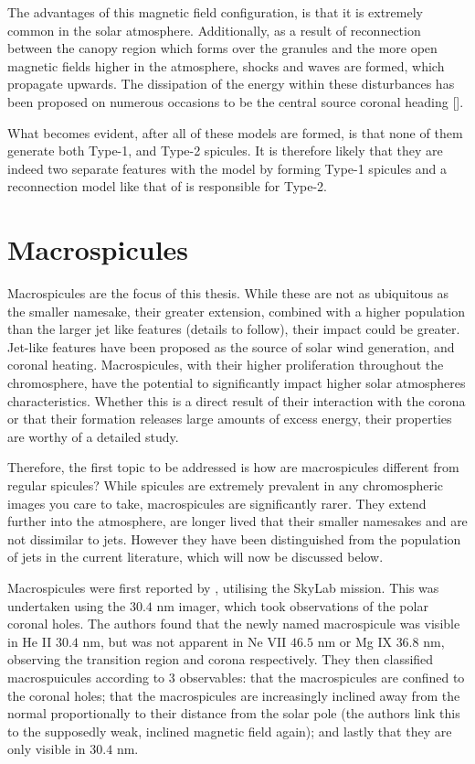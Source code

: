 The advantages of this magnetic field configuration, is that it is extremely common in the solar atmosphere.
Additionally, as a result of reconnection between the canopy region which forms over the granules and the more open magnetic fields higher in the atmosphere, shocks and waves are formed, which propagate upwards.
The dissipation of the energy within these disturbances has been proposed on numerous occasions to be the central source coronal heading [\cite{Klimchuk2012, Kudoh1999, Athay2000}]. 

What becomes evident, after all of these models are formed, is that none of them generate both Type-1, and Type-2 spicules.
It is therefore likely that they are indeed two separate features with the model by \cite{DePointeu2004} forming Type-1 spicules and a reconnection model like that of \cite{Moore2011spic_recon} is responsible for Type-2.


\section{Macrospicules}
\label{sec:MS}

Macrospicules are the focus of this thesis.
While these are not as ubiquitous as the smaller namesake, their greater extension, combined with a higher population than the larger jet like features (details to follow), their impact could be greater.
Jet-like features have been proposed as the source of solar wind generation, and coronal heating. 
Macrospicules, with their higher proliferation throughout the chromosphere, have the potential to significantly impact higher solar atmospheres characteristics. 
Whether this is a direct result of their interaction with the corona or that their formation releases large amounts of excess energy, their properties are worthy of a detailed study.

Therefore, the first topic to be addressed is how are macrospicules different from regular spicules?
While spicules are extremely prevalent in any chromospheric images you care to take, macrospicules are significantly rarer.
They extend further into the atmosphere, are longer lived that their smaller namesakes and are not dissimilar to jets. 
However they have been distinguished from the population of jets in the current literature, which will now be discussed below.

Macrospicules were first reported by \cite{Bohlin1975}, utilising the SkyLab mission.
This was undertaken using the $30.4$ nm imager, which took observations of the polar coronal holes.
The authors found that the newly named macrospicule was visible in He II $30.4$ nm, but was not apparent in Ne VII $46.5$ nm or Mg IX $36.8$ nm, observing the transition region and corona respectively.
They then classified macrospuicules according to 3 observables: that the macrospicules are confined to the coronal holes; that the macrospicules are increasingly inclined away from the normal proportionally to their distance from the solar pole (the authors link this to the supposedly weak, inclined magnetic field again); and lastly that they are only visible in $30.4$ nm.

